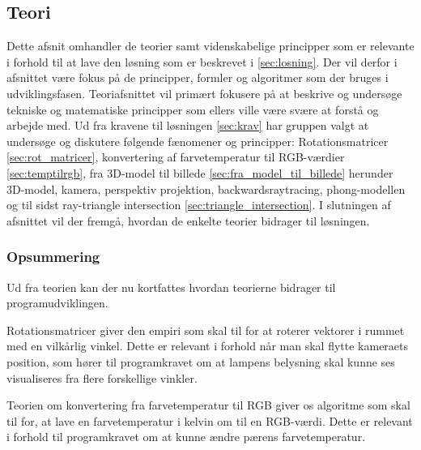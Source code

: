 \subsection{Teori}
\label{sec:teori}

Dette afsnit omhandler de teorier samt videnskabelige principper som er relevante i forhold til at lave den løsning som er beskrevet i \ref{sec:losning}. Der vil derfor i afsnittet være fokus på de principper, formler og algoritmer som der bruges i udviklingsfasen. Teoriafsnittet vil primært fokusere på at beskrive og undersøge tekniske og matematiske principper som ellers ville være svære at forstå og arbejde med. Ud fra kravene til løsningen \ref{sec:krav} har gruppen valgt at undersøge og diskutere følgende fænomener og principper: Rotationsmatricer \ref{sec:rot_matricer}, konvertering af farvetemperatur til RGB-værdier \ref{sec:temptilrgb}, fra 3D-model til billede \ref{sec:fra_model_til_billede} herunder 3D-model, kamera, perspektiv projektion, backwardsraytracing, phong-modellen og til sidst ray-triangle intersection \ref{sec:triangle_intersection}. I slutningen af afsnittet vil der fremgå, hvordan de enkelte teorier bidrager til løsningen.











\subsubsection*{Opsummering}

Ud fra teorien kan der nu kortfattes hvordan teorierne bidrager til programudviklingen. 

Rotationsmatricer giver den empiri som skal til for at roterer vektorer i rummet med en vilkårlig vinkel. Dette er relevant i forhold når man skal flytte kameraets position, som hører til programkravet om at lampens belysning skal kunne ses visualiseres fra flere forskellige vinkler.

Teorien om konvertering fra farvetemperatur til RGB giver os algoritme som skal til for, at lave en farvetemperatur i kelvin om til en RGB-værdi. Dette er relevant i forhold til programkravet om at kunne ændre pærens farvetemperatur. 

